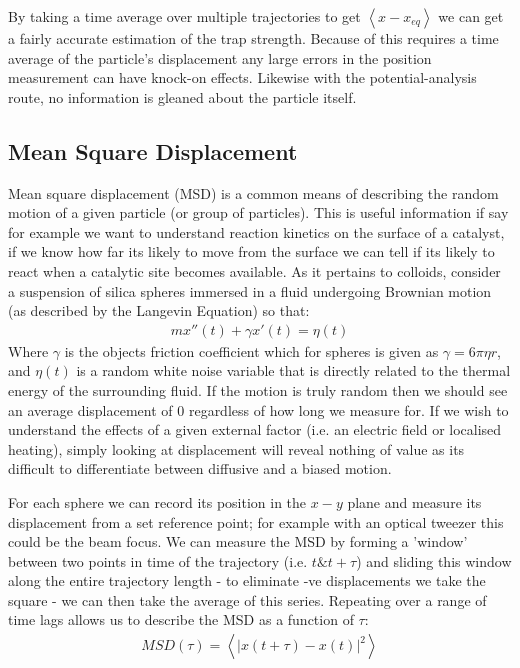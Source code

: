 \documentclass[a4paper,oneside,11pt]{book}
\begin{document}
By taking a time average over multiple trajectories to get $\left<x-x_{eq}\right>$ we can get a fairly accurate estimation of the trap strength. Because of this requires a time average of the particle's displacement any large errors in the position measurement can have knock-on effects. Likewise with the potential-analysis route, no information is gleaned about the particle itself.

\subsection{Mean Square Displacement}
Mean square displacement (MSD) is a common means of describing the random motion of a given particle (or group of particles). This is useful information if say for example we want to understand reaction kinetics on the surface of a catalyst, if we know how far its likely to move from the surface we can tell if its likely to react when a catalytic site becomes available. As it pertains to colloids, consider a suspension of silica spheres immersed in a fluid undergoing Brownian motion (as described by the Langevin Equation) so that:
\begin{align}
	mx''(t) + \gamma x'(t) = \eta(t)
\end{align}
Where $\gamma$ is the objects friction coefficient which for spheres is given as $\gamma = 6\pi\eta r$, and $\eta(t)$ is a random white noise variable that is directly related to the thermal energy of the surrounding fluid. If the motion is truly random then we should see an average displacement of 0 regardless of how long we measure for. If we wish to understand the effects of a given external factor (i.e. an electric field or localised heating), simply looking at displacement will reveal nothing of value as its difficult to differentiate between diffusive and a biased motion. 

For each sphere we can record its position in the $x-y$ plane and measure its displacement from a set reference point; for example with an optical tweezer this could be the beam focus. We can measure the MSD by forming a 'window' between two points in time of the trajectory (i.e. $t \&  t+\tau$) and sliding this window along the entire trajectory length - to eliminate -ve displacements we take the square - we can then take the average of this series. Repeating over a range of time lags allows us to describe the MSD as a function of $\tau$:
\begin{align}
	MSD(\tau) = \left<|x(t+\tau) - x(t)|^2\right>
\end{align}
\end{document}
